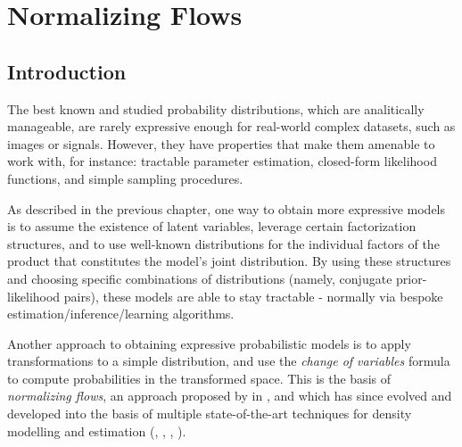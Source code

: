 \chapter{Normalizing Flows}
\label{chapter:probmodel}

\section{Introduction}
The best known and studied probability distributions, which are analitically
manageable, are rarely expressive enough for real-world complex datasets, such
as images or signals. However, they have properties that make them amenable to
work with, for instance: tractable parameter estimation, closed-form likelihood
functions, and simple sampling procedures.

As described in the previous chapter, one way to obtain more expressive models is
to assume the existence of latent variables, leverage certain factorization
structures, and to use well-known distributions for the individual factors of the product that
constitutes the model's joint distribution. By using these structures and choosing
specific combinations of distributions (namely, conjugate prior-likelihood pairs),
these models are able to stay tractable - normally via bespoke estimation/inference/learning
algorithms.

Another approach to obtaining expressive probabilistic models is to apply
transformations to a simple distribution, and use the \emph{change of variables}
formula to compute probabilities in the transformed space. This is the basis
of \emph{normalizing flows}, an approach proposed by \citeauthor{shakir_nf} in \autocite{shakir_nf},
and which has since evolved and developed into the basis of multiple state-of-the-art
techniques for density modelling and estimation (\autocite{Glow}, \autocite{real-nvp}, \autocite{bnaf19},
\autocite{NIPS2017_6828}).

